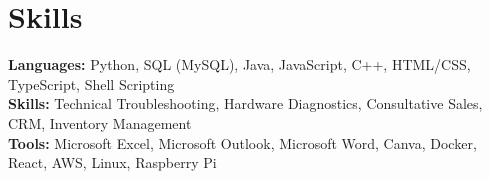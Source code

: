 \documentclass[11pt]{article}       %
\begin{document}

\vspace{-18.5pt}

\section*{Skills}
\textbf{Languages:} Python, SQL (MySQL), Java, JavaScript, C++, HTML/CSS, TypeScript, Shell Scripting\\
\textbf{Skills:} Technical Troubleshooting, Hardware Diagnostics, Consultative Sales, CRM, Inventory Management\\
\textbf{Tools:} Microsoft Excel, Microsoft Outlook, Microsoft Word, Canva, Docker, React, AWS, Linux, Raspberry Pi\\

\vspace{-6.5pt}
\end{document}
